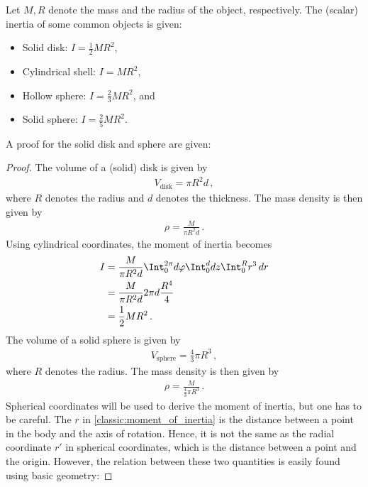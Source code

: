     \begin{example}
        Let $M,R$ denote the mass and the radius of the object, respectively. The (scalar) inertia of some common objects is given:
        \begin{itemize}
            \item Solid disk: $I = \frac{1}{2}MR^2$,
            \item Cylindrical shell: $I = MR^2$,
            \item Hollow sphere: $I = \frac{2}{3}MR^2$, and
            \item Solid sphere: $I = \frac{2}{5}MR^2$.
        \end{itemize}
        A proof for the solid disk and sphere are given:
        \begin{mdframed}[roundcorner=10pt, linecolor=blue, linewidth=1pt]
            \begin{proof}
                The volume of a (solid) disk is given by
                \begin{gather*}
                    V_{\text{disk}}=\pi R^2d\,,
                \end{gather*}
                where $R$ denotes the radius and $d$ denotes the thickness. The mass density is then given by
                \begin{gather*}
                    \rho=\frac{M}{\pi R^2d}\,.
                \end{gather*}
                Using cylindrical coordinates, the moment of inertia becomes
                \begin{align*}
                    I &= \frac{M}{\pi R^2d}\Int_0^{2\pi}d\varphi\Int_0^ddz\Int_0^Rr^3\,dr\\
                    &= \frac{M}{\pi R^2d}2\pi d\frac{R^4}{4}\\
                    &= \frac{1}{2}MR^2\,.
                \end{align*}
                The volume of a solid sphere is given by
                \begin{gather*}
                    V_{\text{sphere}} = \frac{4}{3}\pi R^3\,,
                \end{gather*}
                where $R$ denotes the radius. The mass density is then given by
                \begin{gather*}
                    \rho = \frac{M}{\frac{4}{3}\pi R^3}\,.
                \end{gather*}
                Spherical coordinates will be used to derive the moment of inertia, but one has to be careful. The $r$ in \cref{classic:moment_of_inertia} is the distance between a point in the body and the axis of rotation. Hence, it is not the same as the radial coordinate $r'$ in spherical coordinates, which is the distance between a point and the origin. However, the relation between these two quantities is easily found using basic geometry:

\end{proof}
\end{mdframed}
\end{example}
